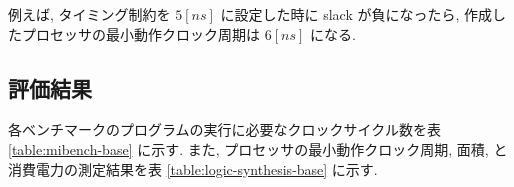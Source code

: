 \documentclass[../main.tex]{subfiles}
\begin{document}
  例えば, タイミング制約を $5[ns]$ に設定した時に slack が負になったら, 
  作成したプロセッサの最小動作クロック周期は $6[ns]$ になる.

  \subsection{評価結果}
  各ベンチマークのプログラムの実行に必要なクロックサイクル数を表 \ref{table:mibench-base} に示す.
  また, プロセッサの最小動作クロック周期, 面積, と消費電力の測定結果を表 \ref{table:logic-synthesis-base} に示す.

  \begin{table}[tbh]
    \centering
    \caption{ベンチマークプログラムの実行クロックサイクル数(改善前)}
    \label{table:mibench-base}
  \end{table}

  \begin{table}[tbh]
    \centering
    \caption{論理合成の結果(改善前)}
    \label{table:logic-synthesis-base}
  \end{table}
\end{document}
